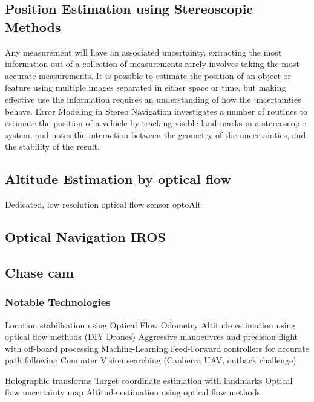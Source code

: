 \documentclass[a4paper, 11pt, titlepage]{article}
\begin{document}
    \subsection{Position Estimation using Stereoscopic Methods}
      Any measurement will have an associated uncertainty, extracting the most information out of a collection of measurements rarely involves taking the most accurate measurements.  It is possible to estimate the position of an object or feature using multiple images separated in either space or time, but making effective use the information requires an understanding of how the uncertainties behave.  Error Modeling in Stereo Navigation \cite{stereoUnc} investigates a number of routines to estimate the position of a vehicle by tracking visible land-marks in a stereoscopic system, and notes the interaction between the geometry of the uncertainties, and the stability of the result.


    \subsection{Altitude Estimation by optical flow}
      Dedicated, low resolution optical flow sensor 
    optoAlt

    \subsection{Optical Navigation IROS}
    \subsection{Chase cam}

    \subsubsection{Notable Technologies}
    Location stabilisation using Optical Flow Odometry
    Altitude estimation using optical flow methods (DIY Drones)
    Aggressive manoeuvres and precision flight with off-board processing
    Machine-Learning Feed-Forward controllers for accurate path following
    Computer Vision searching (Canberra UAV, outback challenge)



    Holographic transforms
    Target coordinate estimation with landmarks
    Optical flow uncertainty map
    Altitude estimation using optical flow methods
\end{document}
